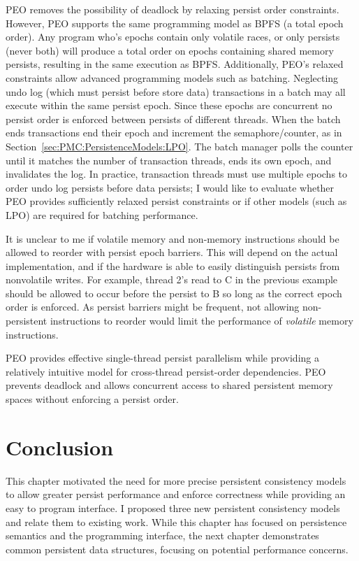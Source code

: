 PEO removes the possibility of deadlock by relaxing persist order constraints.
However, PEO supports the same programming model as BPFS (a total epoch order).
Any program who's epochs contain only volatile races, or only persists (never both) will produce a total order on epochs containing shared memory persists, resulting in the same execution as BPFS.
Additionally, PEO's relaxed constraints allow advanced programming models such as batching.
Neglecting undo log (which must persist before store data) transactions in a batch may all execute within the same persist epoch.
Since these epochs are concurrent no persist order is enforced between persists of different threads.
When the batch ends transactions end their epoch and increment the semaphore/counter, as in Section~\ref{sec:PMC:PersistenceModels:LPO}.
The batch manager polls the counter until it matches the number of transaction threads, ends its own epoch, and invalidates the log.
In practice, transaction threads must use multiple epochs to order undo log persists before data persists; I would like to evaluate whether PEO provides sufficiently relaxed persist constraints or if other models (such as LPO) are required for batching performance.

It is unclear to me if volatile memory and non-memory instructions should be allowed to reorder with persist epoch barriers.
This will depend on the actual implementation, and if the hardware is able to easily distinguish persists from nonvolatile writes.
For example, thread 2's read to C in the previous example should be allowed to occur before the persist to B so long as the correct epoch order is enforced.
As persist barriers might be frequent, not allowing non-persistent instructions to reorder would limit the performance of \emph{volatile} memory instructions.

PEO provides effective single-thread persist parallelism while providing a relatively intuitive model for cross-thread persist-order dependencies.
PEO prevents deadlock and allows concurrent access to shared persistent memory spaces without enforcing a persist order.

\section{Conclusion}
\label{sec:PMC:Conclusion}

This chapter motivated the need for more precise persistent consistency models to allow greater persist performance and enforce correctness while providing an easy to program interface.
I proposed three new persistent consistency models and relate them to existing work.
While this chapter has focused on persistence semantics and the programming interface, the next chapter demonstrates common persistent data structures, focusing on potential performance concerns.
